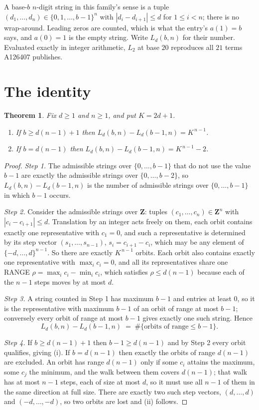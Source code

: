 \documentclass[11pt,a4paper]{article}
\theoremstyle{plain}
\newtheorem{theorem}{Theorem}
\theoremstyle{definition}
\begin{document}
A base-$b$ $n$-digit string in this family's sense is a tuple
$(d_1,\dots,d_n)\in\{0,1,\dots,b-1\}^{n}$ with $|d_i-d_{i+1}|\le d$ for $1\le i<n$; there
is no wrap-around. Leading zeros are counted, which is what the entry's $a(1)=b$ says, and
$a(0)=1$ is the empty string. Write $L_d(b,n)$ for their number. Evaluated exactly in integer
arithmetic, $L_{2}$ at base $20$ reproduces all $21$ terms A126407 publishes.

\section{The identity}

\begin{theorem}
Fix $d\ge1$ and $n\ge1$, and put $K=2d+1$.
\begin{enumerate}
\item[(i)] If $b\ge d(n-1)+1$ then $L_d(b,n)-L_d(b-1,n)=K^{\,n-1}$.
\item[(ii)] If $b=d(n-1)$ then $L_d(b,n)-L_d(b-1,n)=K^{\,n-1}-2$.
\end{enumerate}
\end{theorem}

\begin{proof}
\emph{Step 1.} The admissible strings over $\{0,\dots,b-1\}$ that do not use the value $b-1$
are exactly the admissible strings over $\{0,\dots,b-2\}$, so $L_d(b,n)-L_d(b-1,n)$ is the
number of admissible strings over $\{0,\dots,b-1\}$ in which $b-1$ occurs.

\emph{Step 2.} Consider the admissible strings over $\mathbf{Z}$: tuples
$(c_1,\dots,c_n)\in\mathbf{Z}^{n}$ with $|c_i-c_{i+1}|\le d$. Translation by an integer acts
freely on them, each orbit contains exactly one representative with $c_1=0$, and such a
representative is determined by its step vector $(s_1,\dots,s_{n-1})$, $s_i=c_{i+1}-c_i$,
which may be any element of $\{-d,\dots,d\}^{n-1}$. So there are exactly $K^{\,n-1}$ orbits.
Each orbit also contains exactly one representative with $\max_i c_i=0$, and all its
representatives share one RANGE $\rho=\max_ic_i-\min_ic_i$, which satisfies
$\rho\le d(n-1)$ because each of the $n-1$ steps moves by at most $d$.

\emph{Step 3.} A string counted in Step 1 has maximum $b-1$ and entries at least $0$, so it is
the representative with maximum $b-1$ of an orbit of range at most $b-1$; conversely every orbit
of range at most $b-1$ gives exactly one such string. Hence
\[
L_d(b,n)-L_d(b-1,n)\;=\;\#\{\text{orbits of range}\le b-1\} .
\]

\emph{Step 4.} If $b\ge d(n-1)+1$ then $b-1\ge d(n-1)$ and by Step 2 every orbit qualifies,
giving (i). If $b=d(n-1)$ then exactly the orbits of range $d(n-1)$ are excluded. An orbit has
range $d(n-1)$ only if some $c_i$ attains the maximum, some $c_j$ the minimum, and the walk
between them covers $d(n-1)$; that walk has at most $n-1$ steps, each of size at most $d$, so it
must use all $n-1$ of them in the same direction at full size. There are exactly two such step
vectors, $(d,\dots,d)$ and $(-d,\dots,-d)$, so two orbits are lost and (ii) follows.
\end{proof}
\end{document}
